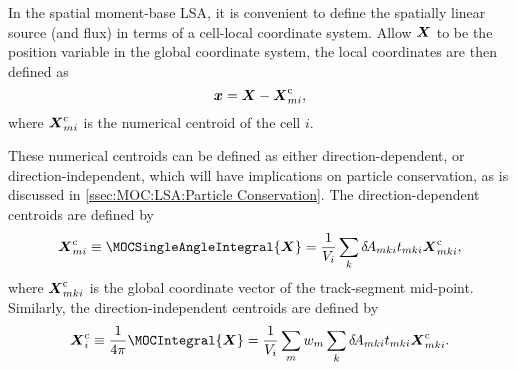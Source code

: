 {{{            In the spatial moment-base \ac{LSA}, it is convenient to define the spatially linear source (and flux) in terms of a cell-local coordinate system.
            Allow $\boldsymbol{X}$ to be the position variable in the global coordinate system, the local coordinates are then defined as
            \begin{equation}\label{eq:MOC:LSA:Global to Local Coordinates}
                \loc = \Loc - \centroid[\Loc][mi],
            \end{equation}
            where $\centroid[\Loc][mi]$ is the numerical centroid of the cell $i$.

            These numerical centroids can be defined as either direction-dependent, or direction-independent, which will have implications on particle conservation, as is discussed in \cref{ssec:MOC:LSA:Particle Conservation}.
            The direction-dependent centroids are defined by
            \begin{equation}\label{eq:MOC:LSA:Direction-Dependent Centroids}
                \centroid[\Loc][mi] \defined \MOCSingleAngleIntegral{\Loc} = \frac{1}{V_i}\suml[k]\tA[mki]\nsegl\locCent[\Loc],
            \end{equation}
            where $\locCent[\Loc]$ is the global coordinate vector of the track-segment mid-point.
            Similarly, the direction-independent centroids are defined by
            \begin{equation}\label{eq:MOC:LSA:Direction-Independent Centroids}
                \centroid[\Loc][i] \defined \rfourpi\MOCIntegral{\Loc} = \frac{1}{V_i}\suml[m]\wt\suml[k]\tA[mki]\nsegl\locCent[\Loc].
            \end{equation}

}}}
